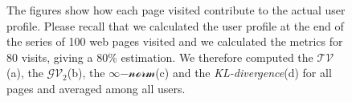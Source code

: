 \begin{figure}
\centering
	\hfil

    \hfil

\caption[Page impact on the actual user's profile]{The figures show how each page visited contribute to the actual user profile. Please recall that we calculated the user profile at the end of the series of 100 web pages visited and we calculated the metrics for 80 visits, giving a 80\% estimation. %
We therefore computed the $\mathcal{TV}$(a), the $\mathcal{GV_2}$(b), the $\infty\mathcal{-norm}$(c) and the \emph{KL-divergence}(d) for all pages and averaged among all users.\label{fig:average-pop-profiles} }%
\end{figure}

